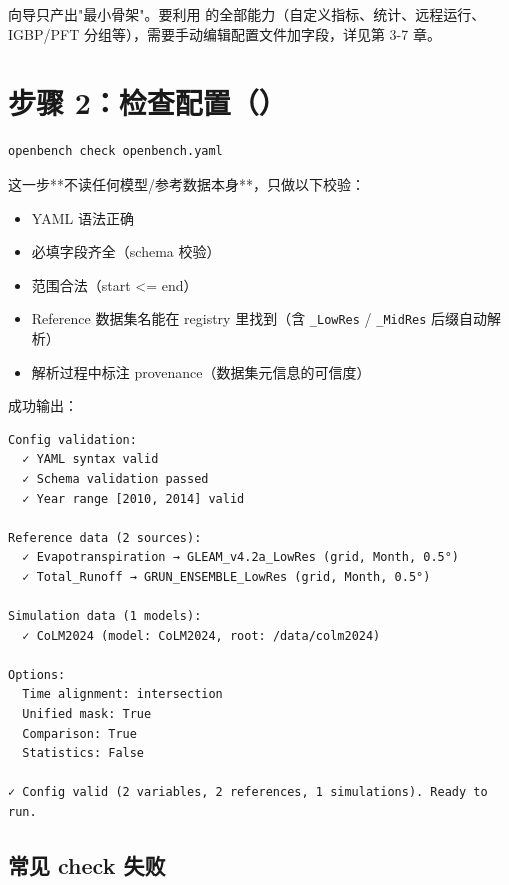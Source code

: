 \begin{noteBox}
向导只产出"最小骨架"。要利用 \openbench{} 的全部能力（自定义指标、统计、远程运行、IGBP/PFT 分组等），需要手动编辑配置文件加字段，详见第 3-7 章。
\end{noteBox}

\section{步骤 2：检查配置（）}

\begin{verbatim}
openbench check openbench.yaml
\end{verbatim}

这一步**不读任何模型/参考数据本身**，只做以下校验：

\begin{itemize}
  \item YAML 语法正确
  \item 必填字段齐全（schema 校验）
  \item {} 范围合法（start <= end）
  \item Reference 数据集名能在 registry 里找到（含 \texttt{\_LowRes} / \texttt{\_MidRes} 后缀自动解析）
  \item 解析过程中标注 provenance（数据集元信息的可信度）
\end{itemize}

成功输出：

\begin{exampleBox}
\begin{verbatim}
Config validation:
  ✓ YAML syntax valid
  ✓ Schema validation passed
  ✓ Year range [2010, 2014] valid

Reference data (2 sources):
  ✓ Evapotranspiration → GLEAM_v4.2a_LowRes (grid, Month, 0.5°)
  ✓ Total_Runoff → GRUN_ENSEMBLE_LowRes (grid, Month, 0.5°)

Simulation data (1 models):
  ✓ CoLM2024 (model: CoLM2024, root: /data/colm2024)

Options:
  Time alignment: intersection
  Unified mask: True
  Comparison: True
  Statistics: False

✓ Config valid (2 variables, 2 references, 1 simulations). Ready to run.
\end{verbatim}
\end{exampleBox}

\subsection{常见 check 失败}

